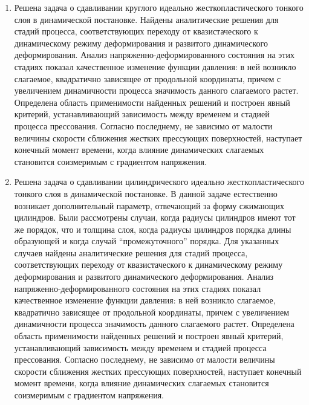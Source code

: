 \begin{enumerate}
  \item Решена задача о сдавливании круглого идеально жесткопластического тонкого слоя в динамической постановке. Найдены аналитические решения для стадий процесса, соответствующих переходу от квазистаческого к динамическому режиму деформирования и развитого динамического деформирования. Анализ напряженно-деформированного состояния на этих стадиях показал качественное изменение функции давления: в ней возникло слагаемое, квадратично зависящее от продольной координаты, причем с увеличением динамичности процесса значимость данного слагаемого растет. Определена область применимости найденных решений и построен явный критерий, устанавливающий зависимость между временем и стадией процесса прессования.  Согласно последнему, не зависимо от малости величины скорости сближения жестких прессующих поверхностей, наступает конечный момент времени, когда влияние динамических слагаемых становится соизмеримым с градиентом напряжения.
  \item Решена задача о сдавливании цилиндрического идеально жесткопластического тонкого слоя в динамической постановке. В данной задаче естественно возникает дополнительный параметр, отвечающий за форму сжимающих цилиндров. Были рассмотрены случаи, когда радиусы цилиндров имеют тот же порядок, что и толщина слоя, когда радиусы цилиндров порядка длины образующей и когда случай ``промежуточного'' порядка. Для указанных случаев найдены аналитические решения для стадий процесса, соответствующих переходу от квазистаческого к динамическому режиму деформирования и развитого динамического деформирования. Анализ напряженно-деформированного состояния на этих стадиях показал качественное изменение функции давления: в ней возникло слагаемое, квадратично зависящее от продольной координаты, причем с увеличением динамичности процесса значимость данного слагаемого растет. Определена область применимости найденных решений и построен явный критерий, устанавливающий зависимость между временем и стадией процесса прессования.  Согласно последнему, не зависимо от малости величины скорости сближения жестких прессующих поверхностей, наступает конечный момент времени, когда влияние динамических слагаемых становится соизмеримым с градиентом напряжения.

\end{enumerate}
